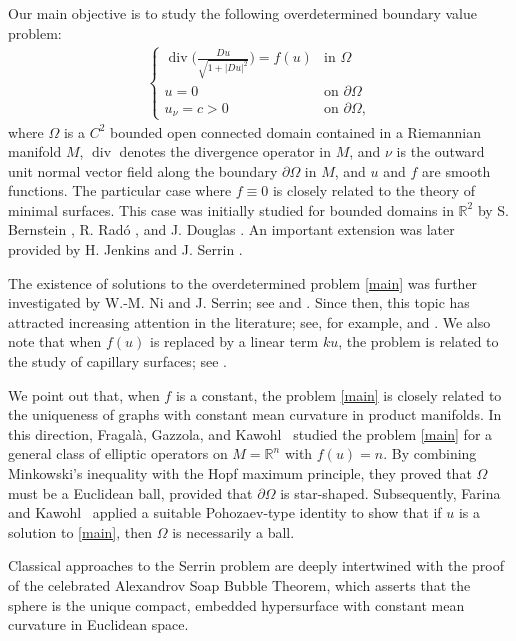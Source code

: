 \documentclass[12pt]{amsart}
\theoremstyle{plain}
\numberwithin{equation}{section}
\begin{document}
Our main objective is to study the following overdetermined boundary value problem:
\begin{align} \label{main}
\left\{
\begin{array}{lll}
 \operatorname{div}\Big(\frac{D u}{\sqrt{1+|D u|^2}}\Big)=f(u) & \text{in } \Omega \\
u= 0& \text{on } \partial\Omega \\
u_{\nu}=c>0& \text{on } \partial\Omega, 
\end{array}
\right.  
\end{align}
where $\Omega$ is a $C^2$ bounded open connected domain contained in a Riemannian manifold $M$, $\operatorname{div}$ denotes the divergence operator in $M$, and $\nu$ is the outward unit normal vector field along the boundary $\partial\Omega$ in $M$, and $u$ and $f$ are smooth functions. The particular case where $f \equiv 0$ is closely related to the theory of minimal surfaces. This case was initially studied for bounded domains in $\mathbb{R}^2$ by S. Bernstein \cite{bernestein}, R. Radó \cite{rado}, and J. Douglas \cite{douglas}. An important extension was later provided by H. Jenkins and J. Serrin \cite{jekins}.

The existence of solutions to the overdetermined problem \eqref{main} was further investigated by W.-M. Ni and J. Serrin; see \cite{Ni} and \cite{serrinex}. Since then, this topic has attracted increasing attention in the literature; see, for example, \cite{alvarez2019} and \cite{lopez}. We also note that when $f(u)$ is replaced by a linear term $ku$, the problem is related to the study of capillary surfaces; see \cite{perko}.

We point out that, when \( f \) is a constant, the problem \eqref{main} is closely related to the uniqueness of graphs with constant mean curvature in product manifolds. In this direction, Fragalà, Gazzola, and Kawohl~\cite{FGK} studied the problem \eqref{main} for a general class of elliptic operators on \( M = \mathbb{R}^n \) with \( f(u) = n \). By combining Minkowski's inequality with the Hopf maximum principle, they proved that \( \Omega \) must be a Euclidean ball, provided that \( \partial\Omega \) is star-shaped. Subsequently, Farina and Kawohl~\cite{FK} applied a suitable Pohozaev-type identity to show that if \( u \) is a solution to \eqref{main}, then \( \Omega \) is necessarily a ball.

Classical approaches to the Serrin problem are deeply intertwined with the proof of the celebrated Alexandrov Soap Bubble Theorem, which asserts that the sphere is the unique compact, embedded hypersurface with constant mean curvature in Euclidean space. 
\end{document}
